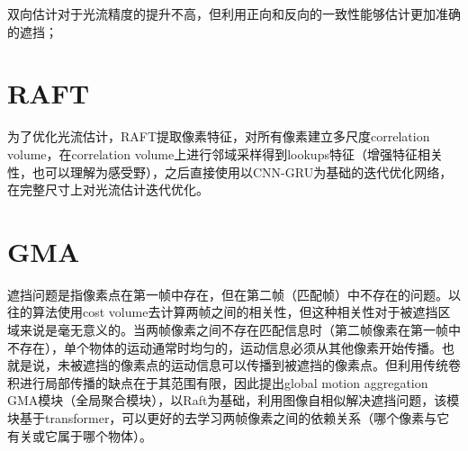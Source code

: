 双向估计对于光流精度的提升不高，但利用正向和反向的一致性能够估计更加准确的遮挡；

\section{RAFT}

为了优化光流估计，RAFT提取像素特征，对所有像素建立多尺度correlation volume，在correlation volume上进行邻域采样得到lookups特征（增强特征相关性，也可以理解为感受野），之后直接使用以CNN-GRU为基础的迭代优化网络，在完整尺寸上对光流估计迭代优化。

\section{GMA}

遮挡问题是指像素点在第一帧中存在，但在第二帧（匹配帧）中不存在的问题。以往的算法使用cost volume去计算两帧之间的相关性，但这种相关性对于被遮挡区域来说是毫无意义的。当两帧像素之间不存在匹配信息时（第二帧像素在第一帧中不存在），单个物体的运动通常时均匀的，运动信息必须从其他像素开始传播。也就是说，未被遮挡的像素点的运动信息可以传播到被遮挡的像素点。但利用传统卷积进行局部传播的缺点在于其范围有限，因此提出global motion aggregation GMA模块（全局聚合模块），以Raft为基础，利用图像自相似解决遮挡问题，该模块基于transformer，可以更好的去学习两帧像素之间的依赖关系（哪个像素与它有关或它属于哪个物体）。

